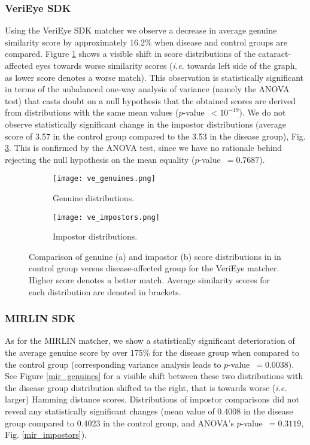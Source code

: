 \documentclass[a4paper]{spie}
\begin{document}
\subsubsection{VeriEye SDK}
Using the VeriEye SDK matcher we observe a decrease in average genuine similarity score by approximately 16.2\% when disease and control groups are compared. Figure \ref{ve_genuines} shows a visible shift in score distributions of the cataract-affected eyes towards worse similarity scores (\emph{i.e.} towards left side of the graph, as lower score denotes a worse match). This observation is statistically significant in terms of the unbalanced one-way analysis of variance (namely the ANOVA test) that casts doubt on a null hypothesis that the obtained scores are derived from distributions with the same mean values ($p$-value~$<10^{-19}$). We do not observe statistically significant change in the impostor distributions (average score of 3.57 in the control group compared to the 3.53 in the disease group), Fig. \ref{ve_impostors}. This is confirmed by the ANOVA test, since we have no rationale behind rejecting the null hypothesis on the mean equality ($p$-value~$=0.7687$).

\begin{figure}[!h]
\centering
\begin{subfigure}{0.5\textwidth}
  \centering
  \texttt{[image: ve\_genuines.png]}
  \caption{Genuine distributions.}
  \label{ve_genuines}
\end{subfigure}%
\begin{subfigure}{0.5\textwidth}
  \centering
  \texttt{[image: ve\_impostors.png]}
  \caption{Impostor distributions.}
  \label{ve_impostors}
\end{subfigure}
\vskip0.2cm
\caption{Comparison of genuine (a) and impostor (b) score distributions in in control group versus disease-affected group for the VeriEye matcher. Higher score denotes a better match. Average similarity scores for each distribution are denoted in brackets.}
\end{figure}

\subsubsection{MIRLIN SDK}
As for the MIRLIN matcher, we show a statistically significant deterioration of the average genuine score by over 175\% for the disease group when compared to the control group (corresponding variance analysis leads to $p$-value~$=0.0038$). See Figure \ref{mir_genuines} for a visible shift between these two distributions with the disease group distribution shifted to the right, that is towards worse (\emph{i.e.} larger) Hamming distance scores. Distributions of impostor comparisons did not reveal any statistically significant changes (mean value of 0.4008 in the disease group compared to 0.4023 in the control group, and ANOVA's $p$-value~$=0.3119$, Fig. \ref{mir_impostors}).
\end{document}
